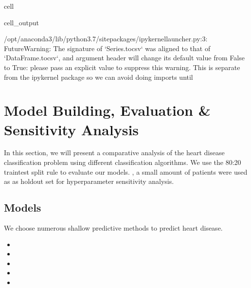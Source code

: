 \documentclass[letterpaper,10pt,english]{jupyterBook}
\begin{document}
\begin{sphinxuseclass}{cell}
\begin{sphinxVerbatimOutput}
\begin{sphinxuseclass}{cell_output}
\begin{sphinxVerbatim}[commandchars=\\\{\}]
/opt/anaconda3/lib/python3.7/site\PYGZhy{}packages/ipykernel\PYGZus{}launcher.py:3: FutureWarning: The signature of `Series.to\PYGZus{}csv` was aligned to that of `DataFrame.to\PYGZus{}csv`, and argument \PYGZsq{}header\PYGZsq{} will change its default value from False to True: please pass an explicit value to suppress this warning.
  This is separate from the ipykernel package so we can avoid doing imports until
\end{sphinxVerbatim}

\end{sphinxuseclass}\end{sphinxVerbatimOutput}

\end{sphinxuseclass}
\sphinxstepscope


\chapter{Model Building, Evaluation \& Sensitivity Analysis}
\label{\detokenize{Model_evaluation:model-building-evaluation-sensitivity-analysis}}\label{\detokenize{Model_evaluation::doc}}
\sphinxAtStartPar
In this section, we will present a comparative analysis of the heart disease classification problem using different classification algorithms. We use the 80:20 train\sphinxhyphen{}test split rule to evaluate our models.
, a small amount of patients were used as  as hold\sphinxhyphen{}out set for hyper\sphinxhyphen{}parameter sensitivity analysis.


\section{Models}
\label{\detokenize{Model_evaluation:models}}
\sphinxAtStartPar
We choose numerous shallow predictive methods to predict heart disease.
\begin{itemize}
\item {} 
\sphinxAtStartPar
{}

\item {} 
\sphinxAtStartPar
{}

\item {} 
\sphinxAtStartPar
{}

\item {} 
\sphinxAtStartPar
{}

\item {} 
\sphinxAtStartPar
{}

\end{itemize}
\end{document}
